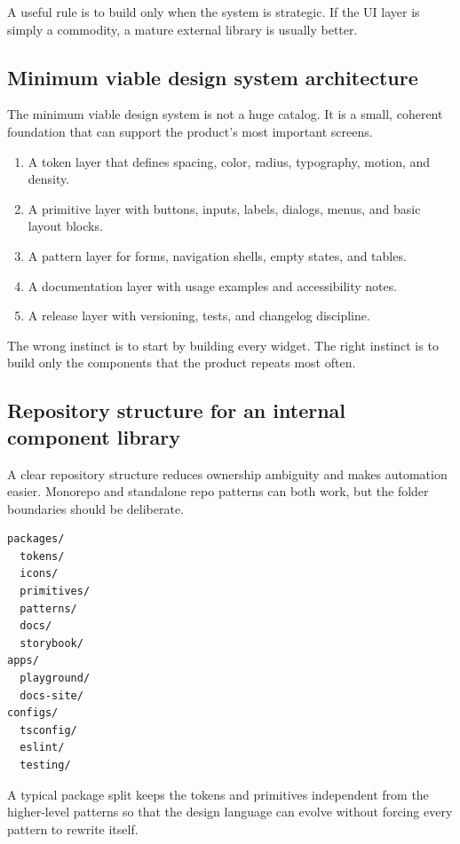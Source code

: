 A useful rule is to build only when the system is strategic. If the UI layer is simply a commodity, a mature external library is usually better.

\subsection{Minimum viable design system architecture}
The minimum viable design system is not a huge catalog. It is a small, coherent foundation that can support the product's most important screens.

\begin{enumerate}[leftmargin=*, itemsep=0.35em]
  \item A token layer that defines spacing, color, radius, typography, motion, and density.
  \item A primitive layer with buttons, inputs, labels, dialogs, menus, and basic layout blocks.
  \item A pattern layer for forms, navigation shells, empty states, and tables.
  \item A documentation layer with usage examples and accessibility notes.
  \item A release layer with versioning, tests, and changelog discipline.
\end{enumerate}

The wrong instinct is to start by building every widget. The right instinct is to build only the components that the product repeats most often.

\subsection{Repository structure for an internal component library}
A clear repository structure reduces ownership ambiguity and makes automation easier. Monorepo and standalone repo patterns can both work, but the folder boundaries should be deliberate.

\begin{verbatim}
packages/
  tokens/
  icons/
  primitives/
  patterns/
  docs/
  storybook/
apps/
  playground/
  docs-site/
configs/
  tsconfig/
  eslint/
  testing/
\end{verbatim}

A typical package split keeps the tokens and primitives independent from the higher-level patterns so that the design language can evolve without forcing every pattern to rewrite itself.

